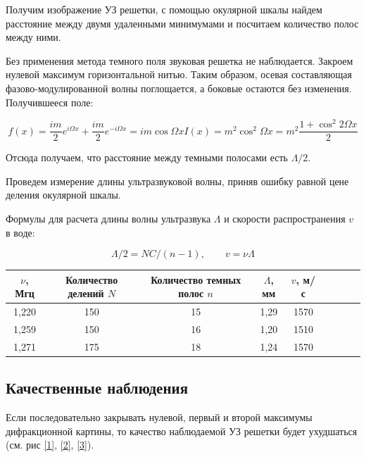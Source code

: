 	Получим изображение УЗ решетки, с помощью окулярной шкалы найдем расстояние между двумя удаленными минимумами и посчитаем количество полос между ними.
	
	Без применения метода темного поля звуковая решетка не наблюдается. Закроем нулевой максимум горизонтальной нитью. Таким образом, осевая составляющая фазово-модулированной волны поглощается, а боковые остаются без изменения. Получившееся поле: 
	
	\begin{equation}\label{}
	f(x) = \dfrac{im}{2} e^{i\Omega x} +  \dfrac{im}{2} e^{-i\Omega x} = im \cos \Omega x I(x) = m^2 \cos ^2 \Omega x = m^2 \dfrac{1 + \cos ^2 2 \Omega x}{2}
	\end{equation}
	
	Отсюда получаем, что расстояние между темными полосами есть $ \Lambda/2 $.
	
	Проведем измерение длины ультразвуковой волны, приняв ошибку равной цене деления окулярной шкалы.
	
	Формулы для расчета длины волны ультразвука $ \Lambda $ и скорости распространения $ v $ в воде:
	
	\begin{equation}\label{}
	\Lambda/2  = NC/(n - 1),  \qquad v = \nu\Lambda
	\end{equation}
	
	\begin{table}
		\centering
		\begin{tabular}{|c|c|c|c|c|c|c|c|c|}
			\hline
			$\nu$, Мгц & Количество делений $N$ & Количество темных полос $n$ & $\Lambda$, мм & $v$, м/с \\ \hline
			1,220 & 150 & 15 & 1,29 & 1570 \\ \hline
			1,259 & 150 & 16 & 1,20 & 1510 \\ \hline
			1,271 & 175 & 18 & 1,24 & 1570 \\ \hline
		\end{tabular}
	\end{table}

	\subsection*{Качественные наблюдения}
	
	Если последовательно закрывать нулевой, первый и второй максимумы дифракционной картины, то качество наблюдаемой УЗ решетки будет ухудшаться (см. рис \ref{1}, \ref{2}, \ref{3}).
	
